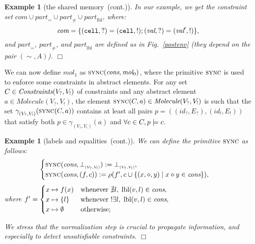 \documentclass{article}
\newcommand{\bydef}{:=}
\newcommand{\boxexample}{$\Box$}
\newtheorem{example}[thm]{Example}
\newcommand{\rec}{?}
\newcommand{\eme}{!}
\newcommand{\internal}[1]{\textnormal{\texttt{#1}}}
\newcommand{\variable}[1]{\textit{#1}}
\newcommand{\ccell}{\internal{cell}}
\newcommand{\datawrite}{\variable{val}'}
\newcommand{\dataread}{\variable{val}}
\newcommand{\idrec}{\textit{id}_{\rec}}
\newcommand{\ideme}{\textit{id}_{\eme}}
\newcommand{\Erec}{E_{\rec}}
\newcommand{\Eeme}{E_{\eme}}
\newcommand{\Vrec}{V_{\rec}}
\newcommand{\Veme}{V_{\eme}}
\newcommand{\continued}{(cont.)}
\newcommand{\Moleculekey}{\textit{Molecule}}
\newcommand{\Moleculeshortkey}{}
\newcommand{\Molecule}[2]{\Moleculekey(#1,#2)}
\newcommand{\gammamolecule}[2]{\gamma^{\Moleculeshortkey}_{({#1},{#2})}}
\newcommand{\botmolecule}[2]{\bot^{\Moleculeshortkey}_{\scriptscriptstyle ({\scriptscriptstyle #1},{\scriptscriptstyle #2})}}
\newcommand{\sat}{\models}
\newcommand{\jsync}{\textsc{sync}}
\newcommand{\sync}[2]{\jsync(#1,#2)}
\newcommand{\cfadomain}{labels and equalities}
\newcommand{\ccfadomain}{\cfadomain\ \continued}
\newcommand{\shareanalysis}{the shared memory}
\newcommand{\cflowanalysis}{\shareanalysis\ \continued}
\begin{document}
\begin{example}[\cflowanalysis]
In our example, we get the constraint set $\textit{com}\cup\textit{part}_=\cup\textit{part}_{\not =}\cup \textit{part}_{\text{lbl}}$, where:
\begin{equation*}
\textit{com}=\{(\ccell,\rec)=(\ccell,\eme);(\dataread,\rec)=(\datawrite,\eme)\},
\end{equation*} and $\textit{part}_=$, $\textit{part}_{\not =}$, and $\textit{part}_{\text{lbl}}$ are defined as in Fig.~\ref{postenv} (they depend on the pair $(\sim,A)$).
\boxexample\end{example}





We can now define $\textit{mol}_1$ as $\sync{\textit{cons}}{\textit{mol}_0}$, where the primitive $\jsync$ is used to enforce some constraints in abstract elements. For any set $\constraintset\in \allconstraint$ of constraints and any abstract element $a\in\Molecule{\Vrec}{\Veme}$, the element $\sync{\constraintset}{a}\in \Molecule{\Vrec}{\Veme}$ 
is such that the set  $\gammamolecule{\Vrec}{\Veme}(\sync{\constraintset}{a})$ contains at least all pairs $p=((\idrec,\Erec),(\ideme,\Eeme))$ that satisfy both  $p \in \gamma_{(\Vrec,\Veme)}(a)$ and  $\forall \constraint \in \constraintset, p \sat \constraint$. 

\begin{example}[\ccfadomain]
We can define the primitive $\jsync$ as follows:
\begin{equation*}
\begin{cases}
\sync{\textit{cons}}{\botmolecule{\Vrec}{\Veme}}\bydef{\botmolecule{\Vrec}{\Veme}},\cr
\sync{\textit{cons}}{(f,c)}\bydef\rho(f',c\cup\{(x,\diamond,y)\;|\;x\diamond y\in \textit{cons}\}),\cr
\end{cases}
\end{equation*}
where
$
f'=\begin{cases}
x\mapsto f(x) & \text{whenever } \nexists l,\; \textrm{lbl}(v,l)\in\textit{cons},\cr
x\mapsto \{l\} & \text{whenever } !\exists l,\; \textrm{lbl}(v,l)\in\textit{cons},\cr
x\mapsto \emptyset & \text{otherwise};
\end{cases}$


\noindent We stress that the normalization step is crucial to propagate information, and especially to detect unsatisfiable constraints.
\boxexample\end{example}
\end{document}
